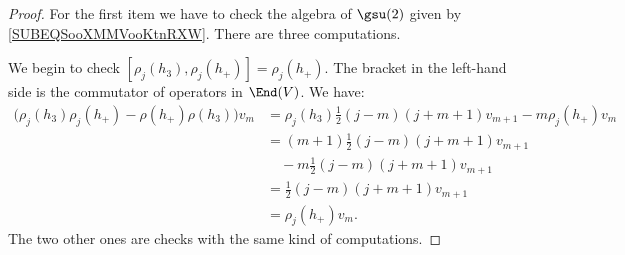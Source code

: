\begin{proof}
	For the first item we have to check the algebra of \( \gsu(2)\) given by \eqref{SUBEQSooXMMVooKtnRXW}. There are three computations.

	We begin to check \( [\rho_j(h_3), \rho_j(h_+)]=\rho_j(h_+)\). The bracket in the left-hand side is the commutator of operators in \( \End(V)\). We have:
	\begin{subequations}
		\begin{align}
			\big( \rho_j(h_3)\rho_j(h_+)-\rho(h_+)\rho(h_3) \big)v_m & =\rho_j(h_3)\frac{ 1 }{2}(j-m)(j+m+1)v_{m+1}-m\rho_j(h_+)v_m \\
			                                                         & =(m+1)\frac{ 1 }{2}(j-m)(j+m+1)v_{m+1}                       \\
			                                                         & \quad-m\frac{ 1 }{2}(j-m)(j+m+1)v_{m+1}                      \\
			                                                         & =\frac{ 1 }{2}(j-m)(j+m+1)v_{m+1}                            \\
			                                                         & =\rho_j(h_+)v_m.
		\end{align}
	\end{subequations}
	The two other ones are checks with the same kind of computations.


\end{proof}
